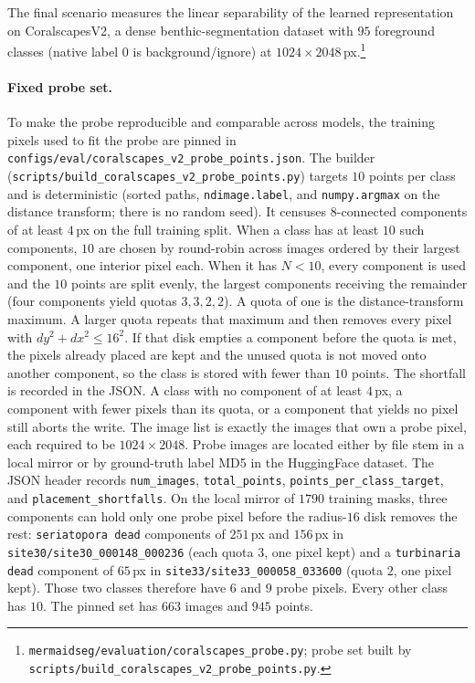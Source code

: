 The final scenario measures the linear separability of the learned
representation on CoralscapesV2, a dense benthic-segmentation dataset with $95$
foreground classes (native label $0$ is background/ignore) at
$1024\times2048$\,px.\footnote{%
\texttt{mermaidseg/evaluation/coralscapes\_probe.py}; probe set built by
\texttt{scripts/build\_coralscapes\_v2\_probe\_points.py}.}

\paragraph{Fixed probe set.}
To make the probe reproducible and comparable across models, the training pixels
used to fit the probe are pinned in
\texttt{configs/eval/coralscapes\_v2\_probe\_points.json}. The builder
(\texttt{scripts/build\_coralscapes\_v2\_probe\_points.py}) targets $10$ points
per class and is deterministic (sorted paths, \texttt{ndimage.label}, and
\texttt{numpy.argmax} on the distance transform; there is no random seed). It
censuses $8$-connected components of at least $4$\,px on the full training
split. When a class has at least $10$ such components, $10$ are chosen by
round-robin across images ordered by their largest component, one interior pixel
each. When it has $N<10$, every component is used and the $10$ points are split
evenly, the largest components receiving the remainder (four components yield
quotas $3,3,2,2$). A quota of one is the distance-transform maximum. A larger
quota repeats that maximum and then removes every pixel with
$dy^{2}+dx^{2}\le 16^{2}$. If that disk empties a component before the quota is
met, the pixels already placed are kept and the unused quota is not moved onto
another component, so the class is stored with fewer than $10$ points. The
shortfall is recorded in the JSON. A class with no component of at least
$4$\,px, a component with fewer pixels than its quota, or a component that
yields no pixel still aborts the write.
The image list is exactly the images that own a probe pixel, each required to be
$1024\times2048$. Probe images are located either by file stem in a local mirror
or by ground-truth label MD5 in the HuggingFace dataset. The JSON header records
\texttt{num\_images}, \texttt{total\_points}, \texttt{points\_per\_class\_target},
and \texttt{placement\_shortfalls}.
On the local mirror of $1790$ training masks, three components can hold only one
probe pixel before the radius-$16$ disk removes the rest: \texttt{seriatopora dead}
components of $251$\,px and $156$\,px in \texttt{site30/site30\_000148\_000236}
(each quota $3$, one pixel kept) and a \texttt{turbinaria dead} component of
$65$\,px in \texttt{site33/site33\_000058\_033600} (quota $2$, one pixel kept).
Those two classes therefore have $6$ and $9$ probe pixels. Every other class has
$10$. The pinned set has $663$ images and $945$ points.

